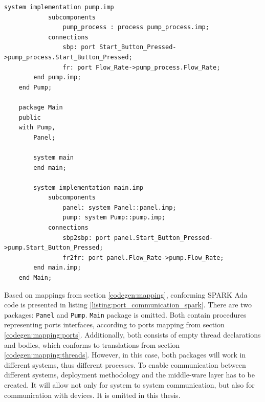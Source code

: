 \begin{lstlisting}[language=aadl, frame=single, gobble=0, caption={AADL model of port communication between systems}]
		system implementation pump.imp
			subcomponents
				pump_process : process pump_process.imp;
			connections
				sbp: port Start_Button_Pressed->pump_process.Start_Button_Pressed;
				fr: port Flow_Rate->pump_process.Flow_Rate;
		end pump.imp;
	end Pump;

	package Main
	public
	with Pump,
		Panel;

		system main	
		end main;
		
		system implementation main.imp
			subcomponents
				panel: system Panel::panel.imp;
				pump: system Pump::pump.imp;
			connections
				sbp2sbp: port panel.Start_Button_Pressed->pump.Start_Button_Pressed;
				fr2fr: port panel.Flow_Rate->pump.Flow_Rate;
		end main.imp;
	end Main;
\end{lstlisting} 
\label{listing:port_communication}
\doublespacing

Based on mappings from section \ref{codegen:mapping}, conforming SPARK Ada code is presented in listing \ref{listing:port_communication_spark}. There are two packages: \lstinline{Panel} and \lstinline{Pump}. \lstinline{Main} package is omitted. Both contain procedures representing ports interfaces, according to ports mapping from section \ref{codegen:mapping:ports}. Additionally, both consists of empty thread declarations and bodies, which conforms to translations from section \ref{codegen:mapping:threads}. However, in this case, both packages will work in different systems, thus different processes.  To enable communication between different systems, deployment methodology and the middle-ware layer has to be created. It will allow not only for system to system communication, but also for communication with devices. It is omitted in this thesis.

